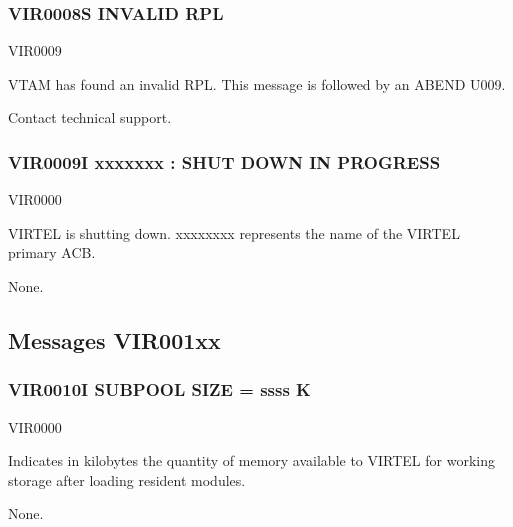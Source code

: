 \documentclass[letterpaper,10pt,english]{sphinxmanual}
\begin{document}
\subsubsection{VIR0008S INVALID RPL}
\label{\detokenize{messages:vir0008s-invalid-rpl}}\begin{description}
\sphinxAtStartPar
VIR0009

\sphinxAtStartPar
VTAM has found an invalid RPL. This message is followed by an ABEND U009.

\sphinxAtStartPar
Contact technical support.

\end{description}


\subsubsection{VIR0009I xxxxxxx : SHUT DOWN IN PROGRESS}
\label{\detokenize{messages:vir0009i-xxxxxxx-shut-down-in-progress}}\begin{description}
\sphinxAtStartPar
VIR0000

\sphinxAtStartPar
VIRTEL is shutting down. xxxxxxxx represents the name of the VIRTEL primary ACB.

\sphinxAtStartPar
None.

\end{description}


\subsection{Messages VIR001xx}
\label{\detokenize{messages:messages-vir001xx}}

\subsubsection{VIR0010I SUBPOOL SIZE = ssss K}
\label{\detokenize{messages:vir0010i-subpool-size-ssss-k}}\begin{description}
\sphinxAtStartPar
VIR0000

\sphinxAtStartPar
Indicates in kilobytes the quantity of memory available to VIRTEL for working storage after loading resident modules.

\sphinxAtStartPar
None.

\end{description}
\end{document}
